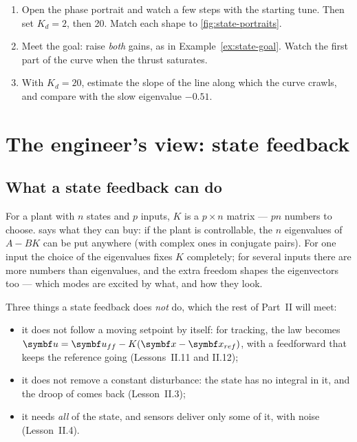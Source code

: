 \begin{trythis}
\begin{enumerate}
  \item Open the phase portrait and watch a few steps with the starting tune. Then set $K_d = 2$, then 20. Match each shape to \cref{fig:state-portraits}.
  \item Meet the goal: raise \emph{both} gains, as in Example~\ref{ex:state-goal}. Watch the first part of the curve when the thrust saturates.
  \item With $K_d = 20$, estimate the slope of the line along which the curve crawls, and compare with the slow eigenvalue $-0.51$.
\end{enumerate}
\end{trythis}

\section{The engineer's view: state feedback}

\subsection{What a state feedback can do}
For a plant with $n$ states and $p$ inputs, $K$ is a $p \times n$ matrix — $pn$ numbers to choose.  says what they can buy: if the plant is controllable, the $n$ eigenvalues of $A - BK$ can be put anywhere (with complex ones in conjugate pairs). For one input the choice of the eigenvalues fixes $K$ completely; for several inputs there are more numbers than eigenvalues, and the extra freedom shapes the eigenvectors too — which modes are excited by what, and how they look.

Three things a state feedback does \emph{not} do, which the rest of Part~II will meet:
\begin{itemize}
  \item it does not follow a moving setpoint by itself: for tracking, the law becomes $\symbf u = \symbf u_{ff} - K(\vx - \vx_{ref})$, with a feedforward that keeps the reference going (Lessons~II.11 and II.12);
  \item it does not remove a constant disturbance: the state has no integral in it, and the droop of  comes back (Lesson~II.3);
  \item it needs \emph{all} of the state, and sensors deliver only some of it, with noise (Lesson~II.4).
\end{itemize}

